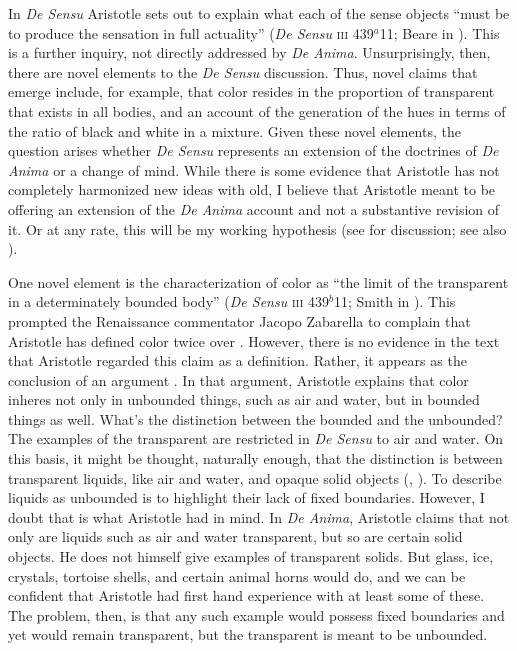 \documentclass[12pt]{article}
\begin{document}
In \emph{De Sensu} Aristotle sets out to explain what each of the sense objects ``must be to produce the sensation in full actuality'' (\emph{De Sensu} \textsc{iii} 439\( ^{a} \)11; Beare in \citealt[7]{Barnes:1984uq}). This is a further inquiry, not directly addressed by \emph{De Anima}. Unsurprisingly, then, there are novel elements to the \emph{De Sensu} discussion. Thus, novel claims that emerge include, for example, that color resides in the proportion of transparent that exists in all bodies, and an account of the generation of the hues in terms of the ratio of black and white in a mixture. Given these novel elements, the question arises whether \emph{De Sensu} represents an extension of the doctrines of \emph{De Anima} or a change of mind. While there is some evidence that Aristotle has not completely harmonized new ideas with old, I believe that Aristotle meant to be offering an extension of the \emph{De Anima} account and not a substantive revision of it. Or at any rate, this will be my working hypothesis (see \citealt{Kahn:1966zr} for discussion; see also \citealt[291]{Caston:2005cr} \citealt[37]{Nussbaum:1995ly}).

One novel element is the characterization of color as ``the limit of the transparent in a determinately bounded body'' (\emph{De Sensu} \textsc{iii} 439\( ^{b} \)11; Smith in \citealt[8]{Barnes:1984uq}). This prompted the Renaissance commentator Jacopo Zabarella to complain that Aristotle has defined color twice over \citep{Broackes:1999uq}. However, there is no evidence in the text that Aristotle regarded this claim as a definition. Rather, it appears as the conclusion of an argument \citep[65]{Broackes:1999uq}. In that argument, Aristotle explains that color inheres not only in unbounded things, such as air and water, but in bounded things as well. What's the distinction between the bounded and the unbounded? The examples of the transparent are restricted in \emph{De Sensu} to air and water. On this basis, it might be thought, naturally enough, that the distinction is between transparent liquids, like air and water, and opaque solid objects (\citealt[59]{Broackes:1999uq}, \citealt[131]{Sorabji:2004fk}). To describe liquids as unbounded is to highlight their lack of fixed boundaries. However, I doubt that is what Aristotle had in mind. In \emph{De Anima}, Aristotle claims that not only are liquids such as air and water transparent, but so are certain solid objects. He does not himself give examples of transparent solids. But glass, ice, crystals, tortoise shells, and certain animal horns would do, and we can be confident that Aristotle had first hand experience with at least some of these. The problem, then, is that any such example would possess fixed boundaries and yet would remain transparent, but the transparent is meant to be unbounded. 
\end{document}
